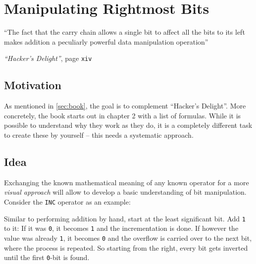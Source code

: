\section{Manipulating Rightmost Bits}\label{sec:rightmost}
\epigraph{
``The fact that the carry chain allows a single bit
to affect all the bits to its left
makes addition a peculiarly powerful data manipulation operation''
}{
\emph{``Hacker's Delight''}, page \texttt{xiv}
\cite{Warren:2012:HD:2462741}
}


\subsection*{Motivation}
As mentioned in \autoref{sec:book},
the goal is to complement ``Hacker's Delight''.
More concretely, the book starts out in chapter 2 with a list of formulas.
While it is possible to understand why they work as they do,
it is a completely different task to create these by yourself
-- this needs a systematic approach.


\subsection*{Idea}
Exchanging the known mathematical meaning of any known operator
for a more \emph{visual approach} will allow to develop
a basic understanding of bit manipulation.
Consider the \lstinline$INC$ operator as an example:

Similar to performing addition by hand,
start at the least significant bit.
Add \lstinline$1$ to it:
If it was \lstinline$0$, it becomes \lstinline$1$
and the incrementation is done.
If however the value was already \lstinline$1$, it becomes \lstinline$0$
and the overflow is carried over to the next bit,
where the process is repeated.
So starting from the right, every bit gets inverted
until the first \lstinline$0$-bit is found.

